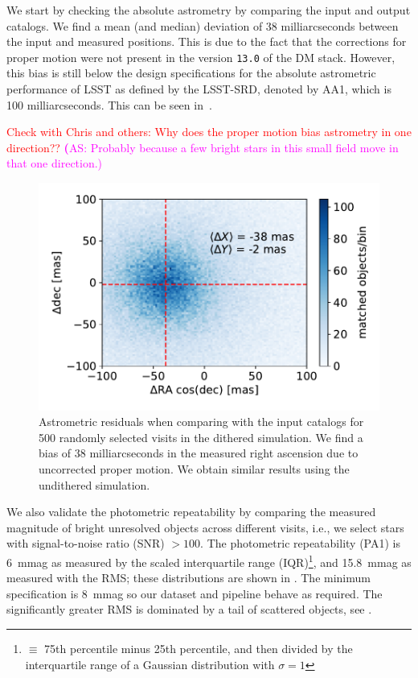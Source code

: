 \documentclass[twocolumn]{aastex62}
\newcommand{\as}[1]{{\textcolor{magenta}{{\textbf (AS: #1)}}}}
\begin{document}
We start by checking the absolute astrometry by comparing the input and output catalogs. We find a mean (and median) deviation of 38 milliarcseconds between the input and measured positions. This is due to the fact that the corrections for proper motion were not present in the version \texttt{13.0} of the DM stack. However, this bias is still below the design specifications for the absolute astrometric performance of LSST as defined by the LSST-SRD, denoted by AA1, which is 100 milliarcseconds. This can be seen in~.

\textcolor{red}{Check with Chris and others: Why does the proper motion bias astrometry in one direction??}
\as{Probably because a few bright stars in this small field move in that one direction.}

\begin{figure}
\centering
\includegraphics[width=0.9\columnwidth]{astrometric_residuals_single_visit_2d}
\caption{Astrometric residuals when comparing with the input catalogs for 500 randomly selected visits in the dithered simulation. We find a bias of 38 milliarcseconds in the measured right ascension due to uncorrected proper motion. We obtain similar results using the undithered simulation.}
\label{fig:AA1}
\end{figure}

We also validate the photometric repeatability by comparing the measured magnitude of bright unresolved objects across different visits, i.e., we select stars with signal-to-noise ratio (SNR) $> 100$. The photometric repeatability (PA1) is 6~mmag as measured by the scaled interquartile range (IQR)\footnote{$\equiv$ 75th percentile minus 25th percentile, and then divided by the interquartile range of a Gaussian distribution with $\sigma=1$}, and 15.8~mmag as measured with the RMS; these distributions are shown in . The minimum specification is 8~mmag so our dataset and pipeline behave as required. The significantly greater RMS is dominated by a tail of scattered objects, see .
\end{document}
